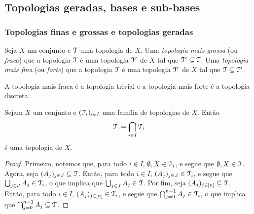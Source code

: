 \subsection{Topologias geradas, bases e sub-bases}

\subsubsection{Topologias finas e grossas e topologias geradas}

\begin{definition}
	Seja $X$ um conjunto e $\mathcal{T}$ uma topologia de $X$. Uma \emph{topologia mais grossa} (ou \emph{fraca}) que a topologia $\mathcal{T}$ é uma topologia $\mathcal{T}'$ de $X$ tal que $\mathcal{T}' \subseteq \mathcal{T}$. Uma \emph{topologia mais fina} (ou \emph{forte}) que a topologia $\mathcal{T}$ é uma topologia $\mathcal{T}'$ de $X$ tal que $\mathcal{T} \subseteq \mathcal{T}'$.
\end{definition}

	A topologia mais fraca é a topologia trivial e a topologia mais forte é a topologia discreta.

\begin{proposition}
	Sejam $X$ um conjunto e $(\mathcal{T}_i)_{i \in I}$ uma família de topologias de $X$. Então
	\begin{equation*}
	\mathcal{T} := \bigcap_{i \in I} \mathcal{T}_i
	\end{equation*}
é uma topologia de $X$.
\end{proposition}
\begin{proof}
	Primeiro, notemos que, para todo $i \in I$, $\emptyset,X \in \mathcal{T}_i$, e segue que $\emptyset,X \in \mathcal{T}$. Agora, seja $(A_j)_{j \in J} \subseteq \mathcal{T}$.  Então, para todo $i \in I$, $(A_j)_{j \in J} \in \mathcal{T}_i$, e segue que $\bigcup_{j \in J} A_j \in \mathcal{T}_i$, o que implica que $\bigcup_{j \in J} A_j \in \mathcal{T}$. Por fim, seja $(A_j)_{j \in [n]} \subseteq \mathcal{T}$. Então, para todo $i \in I$, $(A_j)_{j \in [n]} \in \mathcal{T}_i$, e segue que $\bigcap_{j=0}^{n-1} A_j \in \mathcal{T}_i$, o que implica que $\bigcap_{j=0}^{n-1} A_j \subseteq \mathcal{T}$.
\end{proof}




